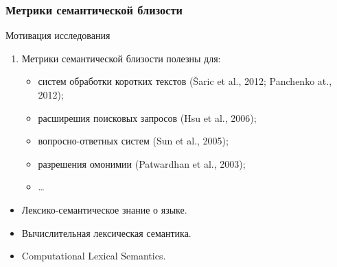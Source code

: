 \begin{frame}
\frametitle{Метрики семантической близости}

\begin{block}{Мотивация исследования}

\begin{enumerate}
\item Метрики семантической близости \alert{полезны} для:
    \begin{itemize}
    \item систем обработки коротких текстов (Šaric et al., 2012; Panchenko at.,
    2012);
    \item расширешия поисковых запросов (Hsu et al., 2006);
    \item вопросно-ответных систем (Sun et al., 2005);
    \item разрешения омонимии (Patwardhan et al., 2003);
    \item \ldots 
    \end{itemize}

\end{enumerate}
\end{block}

\begin{itemize}
  \item Лексико-семантическое знание о языке.
  \item Вычислительная лексическая семантика.
  \item Computational Lexical Semantics. 
\end{itemize}



\note[item]{\ldots}
\note[item]{\ldots}

\end{frame}




